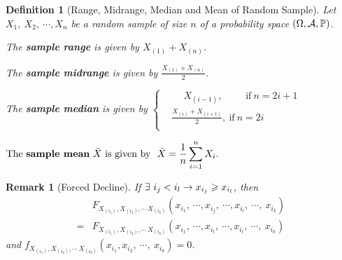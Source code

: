 \documentclass[openany,12pt]{book}
\newtheorem{remark}{Remark}[chapter]
\newtheorem{definition}{Definition}[chapter]
\begin{document}
\begin{definition}[Range, Midrange, Median and Mean of Random Sample]
Let $X_{1},\ X_{2},\ \cdots,X_{n}$ be a random sample of size $n$ of
a probability space $(\Omega,\mathcal{A},\mathbb{P})$.

The \textbf{sample range} is given by
$X_{\left( 1 \right)} + X_{\left( n \right)}$.\vspace{0.5cm}

The \textbf{sample midrange} is given by
$\frac{X_{\left( 1 \right)} + X_{\left( n \right)}}{2}$.

The \textbf{sample median} is given by $\left\{ \begin{aligned}
&\quad\ X_{\left( i - 1 \right)},\qquad\mathrm{\text{\ if}}\ n = 2i + 1 \\
&\frac{X_{\left( i \right)} + X_{\left( i + 1 \right)}}{2},\ \mathrm{\text{if}}\ n = 2i\\
\end{aligned} \right.$\vspace{0.5cm}

$\dis\mathrm{\text{The\ }}\mathrm{\textbf{sample\ mean}}\ \bar{X}\ \mathrm{\text{is\ given\ by}}\text{\ \ }\bar{X} = \frac{1}{n}\sum_{i = 1}^{n}X_{i}.$
\end{definition}

\begin{remark}[Forced Decline]
If $\exists\ i_{j} < i_{l} \to x_{i_{j}} \geqslant x_{i_{l}}$, then
\[\begin{aligned}
&F_{X_{(i_{1})},X_{(i_{2})},\cdots\,X_{(i_{k})}}\left( x_{i_{1}},\ \cdots,x_{i_{j}},\ \cdots,x_{i_{l}},\ \cdots,\ x_{i_{k}} \right) \\
=& F_{X_{(i_{1})},X_{(i_{2})},\cdots\,X_{(i_{k})}}\left( x_{i_{1}},\ \cdots,x_{i_{l}},\ \cdots,x_{i_{l}},\ \cdots,\ x_{i_{k}} \right)\ \end{aligned}\]
and
$f_{X_{(i_{1})},X_{(i_{2})},\cdots\,X_{(i_{k})}}\left( x_{i_{1}},x_{i_{2}},\ \cdots,\ x_{i_{k}} \right) = 0$.
\end{remark}
\end{document}
